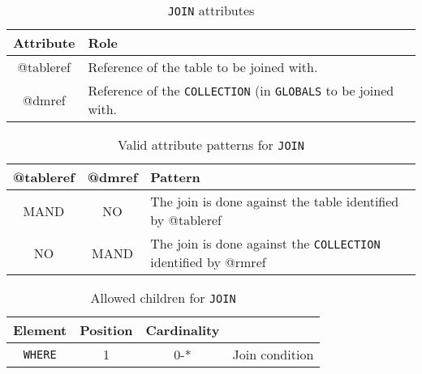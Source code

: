 \begin{lstlisting}[frame=single,caption={\texttt{JOIN} },style=XML,basicstyle=\tiny]

\end{lstlisting}


\begin{table}[!htbp]
\small
\centering
\begin{tabulary}{\linewidth}{|c|J|}       
       \hline 
            \textbf{Attribute} & 
            \textbf {Role}\\
       \hline         \hline  
             @tableref& 
            Reference of the table to be joined with. \\
        \hline 
            @dmref & 
            Reference of the \texttt{COLLECTION} (in \texttt{GLOBALS} to be joined with. \\
        \hline 
     \end{tabulary}
     \caption{\texttt{JOIN} attributes} 
     \label{tbl:join-att}
 \end{table}

\begin{table}[!htbp]
\small
\centering
\begin{tabulary}{\linewidth}{|c|c|J|}
    \hline 
        \textbf{@tableref} &
        \textbf{@dmref} &
        \textbf{Pattern}\\
    \hline      \hline  
        MAND &           
        NO &           
        The join is done against the table identified by @tableref \\
    \hline   
        NO &           
        MAND &           
        The join is done against the \texttt{COLLECTION} identified by @rmref \\
   \hline 
\end{tabulary}
     \caption{Valid attribute patterns for  \texttt{JOIN}}
     \label{tbl:join-pattern}
\end{table}


\begin{table}[!htbp]
\small
\centering
\begin{tabulary}{\linewidth}{|c |c |c|J|}
    \hline 
        \textbf{Element} &
        \textbf{Position} &
        \textbf{Cardinality} &
        \\
    \hline      \hline  
        \texttt{WHERE}  &        
        1 &           
        0-* &
         Join condition\\
    \hline 
\end{tabulary}
     \caption{Allowed children for \texttt{JOIN}} 
     \label{tbl:join-chilren}
 \end{table}